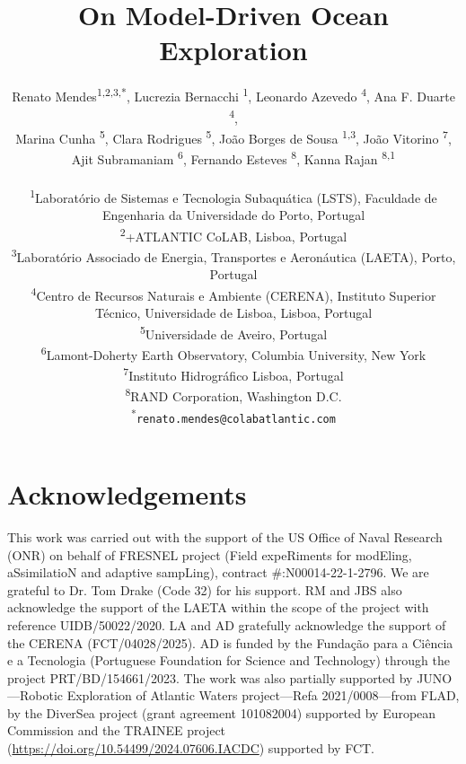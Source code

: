 \documentclass[11pt]{article}
\title{On Model-Driven Ocean Exploration}
\author{
Renato Mendes\textsuperscript{1,2,3,*},
Lucrezia Bernacchi \textsuperscript{1},
Leonardo Azevedo \textsuperscript{4},
Ana F. Duarte \textsuperscript{4},\\
Marina Cunha \textsuperscript{5},
Clara Rodrigues \textsuperscript{5},
João Borges de Sousa \textsuperscript{1,3},
João Vitorino \textsuperscript{7},\\
Ajit Subramaniam \textsuperscript{6},
Fernando Esteves \textsuperscript{8},
Kanna Rajan \textsuperscript{8,1}
\\
\\
\textsuperscript{1}{\scriptsize Laboratório de Sistemas e Tecnologia Subaquática (LSTS), Faculdade de Engenharia da Universidade do Porto, Portugal}\\
\textsuperscript{2}{\scriptsize +ATLANTIC CoLAB, Lisboa, Portugal}\\
\textsuperscript{3}{\scriptsize Laboratório Associado de Energia, Transportes e Aeronáutica (LAETA), Porto, Portugal}\\
\textsuperscript{4}{\scriptsize Centro de Recursos Naturais e Ambiente (CERENA), Instituto Superior T\'{e}cnico, Universidade de Lisboa, Lisboa, Portugal}\\
\textsuperscript{5}{\scriptsize Universidade de Aveiro, Portugal}\\
\textsuperscript{6}{\scriptsize Lamont-Doherty Earth Observatory, Columbia University, New York}\\
\textsuperscript{7}{\scriptsize Instituto Hidrogr{\'a}fico Lisboa, Portugal}\\
\textsuperscript{8}{\scriptsize RAND Corporation, Washington D.C.}\\
\textsuperscript{*}\texttt{{\scriptsize renato.mendes@colabatlantic.com}}
}
\date{}
\begin{document}
\maketitle






\section{Acknowledgements}

This work was carried out with the support of the US Office of Naval
Research (ONR) on behalf of FRESNEL project (Field expeRiments for modEling, aSsimilatioN and adaptive sampLing), contract \#:N00014-22-1-2796. We are grateful to Dr. Tom Drake (Code 32) for his support. RM and JBS also acknowledge the support of the LAETA within the scope of the project with reference UIDB/50022/2020. LA and AD gratefully acknowledge the support of the CERENA (FCT/04028/2025). AD is funded by the Fundação para a Ciência e a Tecnologia (Portuguese Foundation for Science and Technology) through the project PRT/BD/154661/2023. The work was also partially supported by JUNO—Robotic Exploration of Atlantic Waters project—Refa 2021/0008—from FLAD, by the DiverSea project (grant agreement 101082004) supported by European Commission and the TRAINEE project (\url{https://doi.org/10.54499/2024.07606.IACDC}) supported by FCT.


\footnotesize{
  
}
\end{document}
